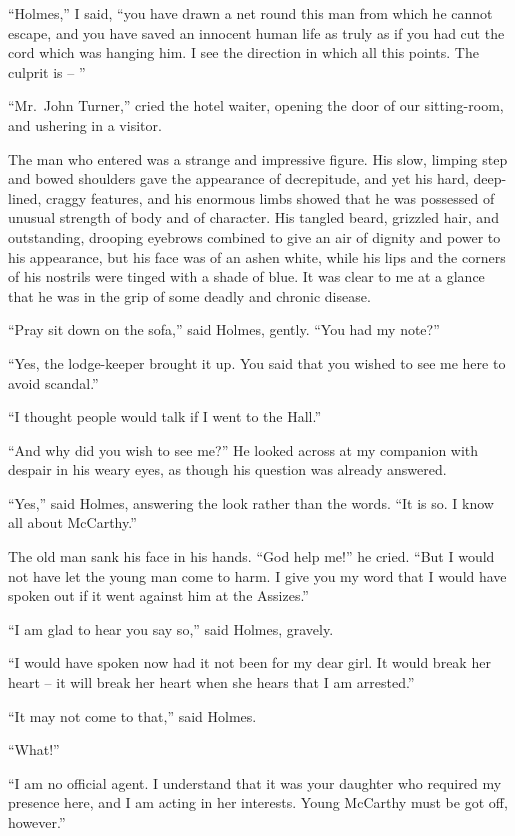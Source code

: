 “Holmes,” I said, “you have drawn a net round this man
from which he cannot escape, and you have saved an innocent
human life as truly as if you had cut the cord which was hanging
him. I see the direction in which all this points. The
culprit is -- ”

“Mr.~John Turner,” cried the hotel waiter, opening the door
of our sitting-room, and ushering in a visitor.

The man who entered was a strange and impressive figure.
His slow, limping step and bowed shoulders gave the appearance
of decrepitude, and yet his hard, deep-lined, craggy features,
and his enormous limbs showed that he was possessed
of unusual strength of body and of character. His tangled
beard, grizzled hair, and outstanding, drooping eyebrows combined
to give an air of dignity and power to his appearance,
but his face was of an ashen white, while his lips and the corners
of his nostrils were tinged with a shade of blue. It was
clear to me at a glance that he was in the grip of some deadly
and chronic disease.

“Pray sit down on the sofa,” said Holmes, gently. “You
had my note?”

“Yes, the lodge-keeper brought it up. You said that you
wished to see me here to avoid scandal.”

“I thought people would talk if I went to the Hall.”

“And why did you wish to see me?” He looked across at
my companion with despair in his weary eyes, as though his
question was already answered.

“Yes,” said Holmes, answering the look rather than the
words. “It is so. I know all about McCarthy.”

The old man sank his face in his hands. “God help me!”
he cried. “But I would not have let the young man come to
harm. I give you my word that I would have spoken out if it
went against him at the Assizes.”

“I am glad to hear you say so,” said Holmes, gravely.

“I would have spoken now had it not been for my dear
girl. It would break her heart -- it will break her heart when
she hears that I am arrested.”

“It may not come to that,” said Holmes.

“What!”

“I am no official agent. I understand that it was your
daughter who required my presence here, and I am acting in
her interests. Young McCarthy must be got off, however.”

